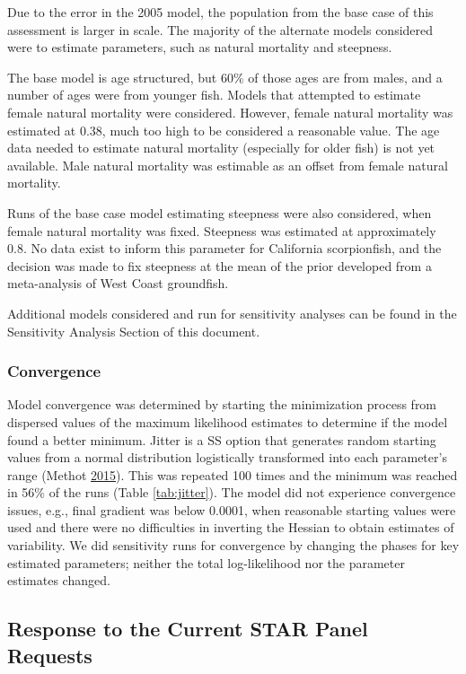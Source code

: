 \documentclass[12pt,]{article}
\begin{document}
Due to the error in the 2005 model, the population from the base case of
this assessment is larger in scale. The majority of the alternate models
considered were to estimate parameters, such as natural mortality and
steepness.

The base model is age structured, but 60\% of those ages are from males,
and a number of ages were from younger fish. Models that attempted to
estimate female natural mortality were considered. However, female
natural mortality was estimated at 0.38, much too high to be considered
a reasonable value. The age data needed to estimate natural mortality
(especially for older fish) is not yet available. Male natural mortality
was estimable as an offset from female natural mortality.

Runs of the base case model estimating steepness were also considered,
when female natural mortality was fixed. Steepness was estimated at
approximately 0.8. No data exist to inform this parameter for California
scorpionfish, and the decision was made to fix steepness at the mean of
the prior developed from a meta-analysis of West Coast groundfish.

Additional models considered and run for sensitivity analyses can be
found in the Sensitivity Analysis Section of this document.

\subsubsection{Convergence}\label{convergence}

Model convergence was determined by starting the minimization process
from dispersed values of the maximum likelihood estimates to determine
if the model found a better minimum. Jitter is a SS option that
generates random starting values from a normal distribution logistically
transformed into each parameter's range (Methot
\protect\hyperlink{ref-Methot2015}{2015}). This was repeated 100 times
and the minimum was reached in 56\% of the runs (Table
\ref{tab:jitter}). The model did not experience convergence issues,
e.g., final gradient was below 0.0001, when reasonable starting values
were used and there were no difficulties in inverting the Hessian to
obtain estimates of variability. We did sensitivity runs for convergence
by changing the phases for key estimated parameters; neither the total
log-likelihood nor the parameter estimates changed.

\subsection{Response to the Current STAR Panel
Requests}\label{response-to-the-current-star-panel-requests}
\end{document}
